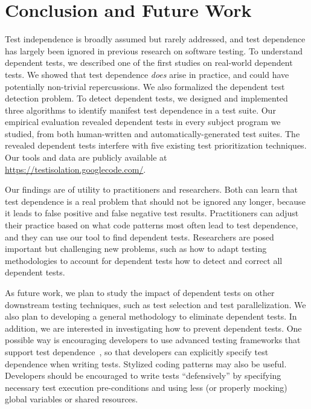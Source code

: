
\vspace{-1mm}
\section{Conclusion and Future Work}
\label{sec:questions}


Test independence is broadly assumed but rarely addressed, and
test dependence has largely been ignored in previous
research on software testing. 
To understand dependent tests, we described one of the first studies on
real-world dependent tests. We showed that 
test dependence \textit{does} arise in practice, and could 
have potentially non-trivial repercussions. We also
formalized the dependent test detection
problem. To detect dependent tests, we designed
and implemented three algorithms to identify manifest test dependence
in a test suite. Our empirical evaluation revealed
dependent tests in every subject program
we studied, from both human-written and automatically-generated test
suites. The revealed dependent tests interfere with
five existing test prioritization techniques.
Our tools and data are publicly available at
\url{https://testisolation.googlecode.com/}.

Our findings are of utility to practitioners and researchers.
Both can learn that test dependence is a real problem that should not be
ignored any longer, because it leads to false positive and false negative
test results.
Practitioners can adjust their practice based on what code patterns most
often lead to test dependence, and they can use our tool to 
find dependent tests.
Researchers are posed important but challenging new problems, such as how
to adapt testing methodologies to account for dependent tests how to detect
and correct all dependent tests.

As future work, we plan to study
the impact of dependent tests on other
downstream testing techniques, such as test selection and
test parallelization.
We also plan to developing
a general methodology to eliminate dependent tests.
In addition, we are interested in investigating how to
prevent dependent tests.
%
One possible way is encouraging developers to
use advanced testing frameworks that support test dependence~\cite{testng},
so that developers can explicitly specify test
dependence when writing tests.
%
Stylized coding patterns may also be useful. Developers
should be encouraged to write tests ``defensively'' by
specifying necessary test execution pre-conditions and
using less (or properly mocking) global variables or shared resources. 


